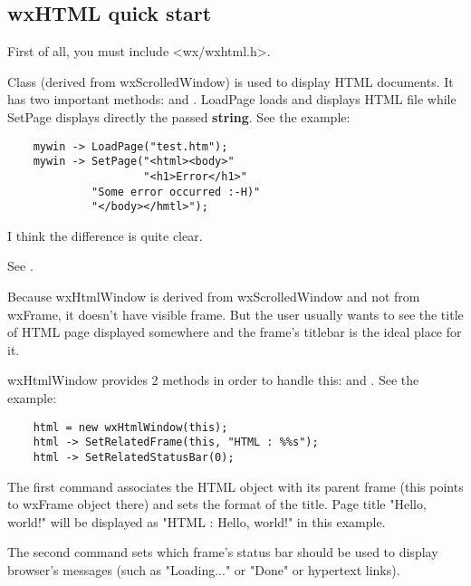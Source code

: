 \subsection{wxHTML quick start}\label{wxhtmlquickstart}


First of all, you must include <wx/wxhtml.h>.

Class  (derived from wxScrolledWindow)
is used to display HTML documents.
It has two important methods:  
and .
LoadPage loads and displays HTML file while SetPage displays directly the
passed {\bf string}. See the example:

\begin{verbatim}
    mywin -> LoadPage("test.htm");
    mywin -> SetPage("<html><body>"
                     "<h1>Error</h1>"
		     "Some error occurred :-H)"
		     "</body></hmtl>");
\end{verbatim}

I think the difference is quite clear.


See .


Because wxHtmlWindow is derived from wxScrolledWindow and not from
wxFrame, it doesn't have visible frame. But the user usually wants to see
the title of HTML page displayed somewhere and the frame's titlebar is 
the ideal place for it.

wxHtmlWindow provides 2 methods in order to handle this: 
 and 
. 
See the example:

\begin{verbatim}
    html = new wxHtmlWindow(this);
    html -> SetRelatedFrame(this, "HTML : %%s");
    html -> SetRelatedStatusBar(0);
\end{verbatim}

The first command associates the HTML object with its parent frame
(this points to wxFrame object there) and sets the format of the title.
Page title "Hello, world!" will be displayed as "HTML : Hello, world!"
in this example.

The second command sets which frame's status bar should be used to display
browser's messages (such as "Loading..." or "Done" or hypertext links).

